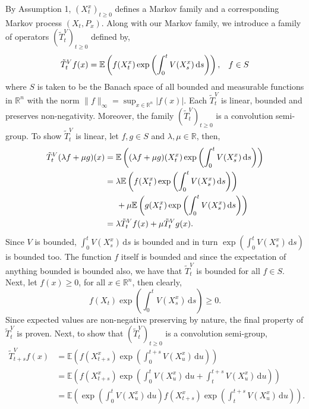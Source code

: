 \documentclass[a4paper,12pt,draft]{report}
\theoremstyle{remark}
\theoremstyle{definition}
\begin{document}
By Assumption 1, $(X_t^x)_{t \ge 0}$ defines a Markov family and a corresponding Markov process $(X_t, P_x)$.  Along with our Markov family, we introduce a family of operators $(\tilde{T}_t^V)_{t \ge 0}$ defined by,
$$
\tilde{T}_t^Vf(x) = \mathbb{E}\left(f(X_t^x)\exp\left(\int_0^t V(X_s^x)\,\mathrm{d}s\right)\right), \hspace{0.3cm} f \in S
$$
where $S$ is taken to be the Banach space of all bounded and measurable functions in $\mathbb{R}^n$ with the norm $\|f\|_\infty = \sup_{x \in \mathbb{R}^n}|f(x)|$.
\lemma
{
Each $\tilde{T}_t^V$ is linear, bounded and preserves non-negativity.  Moreover, the family $(\tilde{T}_t^V)_{t \ge 0}$ is a convolution semi-group.
}
\proof
{
To show $\tilde{T}_t^V$ is linear, let $f, g \in S$ and $\lambda, \mu \in \mathbb{R}$, then,
\begin{align}
\tilde{T}_t^V(\lambda f + \mu g)(x) & = \mathbb{E}\left((\lambda f + \mu g)(X_t^x)\exp\left(\int_0^t V(X_s^x)\,\mathrm{d}s\right)\right)\nonumber\\
& = \lambda \mathbb{E}\left(f(X_t^x)\exp\left(\int_0^t V(X_s^x)\,\mathrm{d}s\right)\right)\nonumber\\
& \hspace{0.5cm} + \mu \mathbb{E}\left(g(X_t^x)\exp\left(\int_0^t V(X_s^x)\,\mathrm{d}s\right)\right)\nonumber\\
& = \lambda\tilde{T}_t^Vf(x) + \mu\tilde{T}_t^Vg(x)\nonumber.
\end{align}
Since $V$ is bounded, $\int_0^tV(X_s^x)\,\mathrm{d}s$ is bounded and in turn $\exp\left(\int_0^tV(X_s^x)\,\mathrm{d}s\right)$ is bounded too.  The function $f$ itself is bounded and since the expectation of anything bounded is bounded also, we have that $\tilde{T}_t^V$ is bounded for all $f \in S$.  Next, let $f(x) \ge 0$, for all $x \in \mathbb{R}^n$, then clearly,
$$
f(X_t)\exp\left(\int_0^t V(X_s^x)\,\mathrm{d}s\right) \ge 0.
$$
Since expected values are non-negative preserving by nature, the final property of $\tilde{T}_t^V$ is proven.
Next, to show that $(\tilde{T}_t^V)_{t \ge 0}$ is a convolution semi-group,
\begin{align}
\tilde{T}_{t + s}^Vf(x) & = \mathbb{E}\left(f(X_{t + s}^x)\exp\left(\int_0^{t + s} V(X_u^x)\,\mathrm{d}u\right)\right)\nonumber\\
& = \mathbb{E}\left(f(X_{t + s}^x)\exp\left(\int_0^t V(X_u^x)\,\mathrm{d}u + \int_t^{t + s} V(X_u^x)\,\mathrm{d}u\right)\right)\nonumber\\
& = \mathbb{E}\left(\exp\left(\int_0^t V(X_u^x)\,\mathrm{d}u\right)f(X_{t + s}^x)\exp\left(\int_t^{t + s} V(X_u^x)\,\mathrm{d}u\right)\right).\nonumber

\end{align}}
\end{document}
